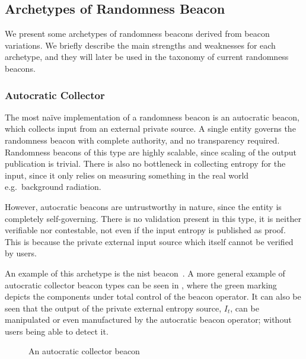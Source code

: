 \subsection{Archetypes of Randomness Beacon}
We present some archetypes of randomness beacons derived from beacon variations.
We briefly describe the main strengths and weaknesses for each archetype,  and they will later be used in the taxonomy of current randomness beacons.

\subsubsection{Autocratic Collector}\label{ssub:autocratic}
The most naïve implementation of a randomness beacon is an autocratic beacon, which collects input from an external private source.
A single entity governs the randomness beacon with complete authority, and no transparency required.
Randomness beacons of this type are highly scalable, since scaling of the output publication is trivial.
There is also no bottleneck in collecting entropy for the input, since it only relies on measuring something in the real world e.g.\ background radiation.

However, autocratic beacons are untrustworthy in nature, since the entity is completely self-governing.
There is no validation present in this type, it is neither verifiable nor contestable, not even if the input entropy is published as proof.
This is because the private external input source which itself cannot be verified by users.

An example of this archetype is the \gls{nist} beacon~\cite{nistbeacon}.
A more general example of autocratic collector beacon types can be seen in , where the green marking depicts the components under total control of the beacon operator.
It can also be seen that the output of the private external entropy source, $I_t$, can be manipulated or even manufactured by the autocratic beacon operator; without users being able to detect it.

\begin{figure}[htb]
    \centering
    \footnotesize
    \caption{An autocratic collector beacon}\label{fig:autocratic_beacon}
\end{figure}



